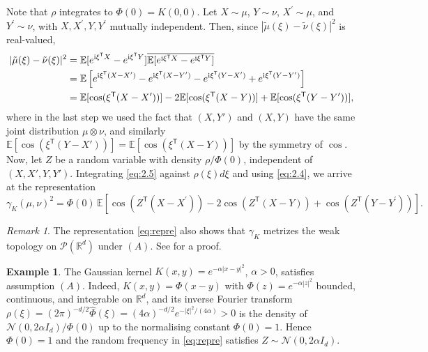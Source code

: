 \documentclass[11pt,leqno]{article}
\theoremstyle{plain}
\theoremstyle{remark}
\newtheorem{rem}[thm]{Remark}
\theoremstyle{definition}
\newtheorem{ex}[thm]{Example}
\numberwithin{equation}{section}
\numberwithin{figure}{section}
\numberwithin{table}{section}
\numberwithin{algorithm}{section}
\newcommand{\EE}{\mathbb{E}}
\newcommand{\RR}{\mathbb{R}}
\newcommand{\cP}{\mathcal{P}}
\begin{document}
Note that $\rho$ integrates to $\Phi(0)=K(0,0)$.
Let $X\sim\mu$, $Y\sim \nu$, $X^{\prime}\sim\mu$, and $Y^{\prime}\sim\nu$, with
$X,X^{\prime},Y,Y^{\prime}$ mutually independent.
Then, since $|\tilde{\mu}(\xi) - \tilde{\nu}(\xi)|^2$ is real-valued,
\begin{align}
|\tilde{\mu}(\xi) - \tilde{\nu}(\xi)|^2
&= \EE[e^{\mathrm{i}\xi^{\mathsf{T}}X} - e^{\mathrm{i}\xi^{\mathsf{T}}Y}]\overline{\EE[e^{\mathrm{i}\xi^{\mathsf{T}}X} - e^{\mathrm{i}\xi^{\mathsf{T}}Y}]} \notag \\
&= \EE\left[e^{\mathrm{i}\xi^{\mathsf{T}}(X-X^{\prime})} - e^{\mathrm{i}\xi^{\mathsf{T}}(X-Y^{\prime})} - e^{\mathrm{i}\xi^{\mathsf{T}}(Y-X^{\prime})} + e^{\mathrm{i}\xi^{\mathsf{T}}(Y-Y^{\prime})}\right] \notag \\
\label{eq:2.5}
&= \EE[\cos(\xi^{\mathsf{T}}(X-X^{\prime}))] - 2\EE[\cos(\xi^{\mathsf{T}}(X-Y))] + \EE[\cos(\xi^{\mathsf{T}}(Y-Y^{\prime}))],
\end{align}
where in the last step we used the fact that $(X,Y')$ and $(X,Y)$ have the same joint distribution $\mu\otimes\nu$,
and similarly $\EE[\cos(\xi^{\mathsf{T}}(Y-X'))] = \EE[\cos(\xi^{\mathsf{T}}(X-Y))]$ by the symmetry of $\cos$.
Now, let $Z$ be a random variable with density $\rho/\Phi(0)$, independent of $(X,X',Y,Y')$.
Integrating \eqref{eq:2.5} against $\rho(\xi)d\xi$ and using \eqref{eq:2.4}, we arrive at the representation
\begin{equation}
\label{eq:repre}
 \gamma_K(\mu,\nu)^2 = \Phi(0)\,\EE\left[\cos(Z^{\mathsf{T}}(X-X^{\prime})) - 2 \cos(Z^{\mathsf{T}}(X-Y)) + \cos(Z^{\mathsf{T}}(Y-Y^{\prime})) \right].
\end{equation}

\begin{rem}\label{rem:2.1}
The representation \eqref{eq:repre} also shows that $\gamma_K$ metrizes the weak topology on $\cP(\RR^d)$ under $(A)$.
See \cite[Proposition 2.1]{nak:2024sb} for a proof.
\end{rem}

\begin{ex}\label{ex:2.2}
The Gaussian kernel $K(x,y)=e^{-\alpha|x-y|^2}$, $\alpha>0$, satisfies assumption $(A)$. 
Indeed, $K(x,y)=\Phi(x-y)$ with $\Phi(z)=e^{-\alpha|z|^2}$ bounded, continuous, and integrable on $\RR^d$,
and its inverse Fourier transform
$\rho(\xi)=(2\pi)^{-d/2}\widehat\Phi(\xi)=(4\alpha)^{-d/2}e^{-|\xi|^2/(4\alpha)}>0$
is the density of $\mathcal{N}(0,2\alpha I_d)/\Phi(0)$ up to the normalising constant $\Phi(0)=1$.
Hence $\Phi(0)=1$ and the random frequency in \eqref{eq:repre} satisfies $Z\sim \mathcal{N}(0,2\alpha I_d)$.
\end{ex}
\end{document}
